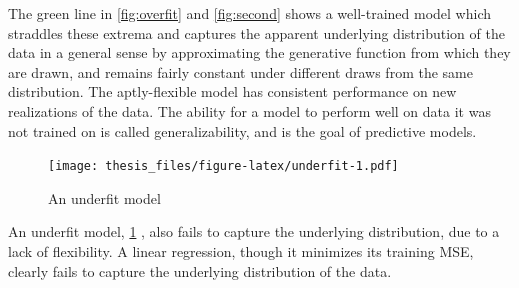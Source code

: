 \documentclass[12pt,twoside]{reedthesis}
\begin{document}
The green line in \ref{fig:overfit} and \ref{fig:second} shows a
well-trained model which straddles these extrema and captures the
apparent underlying distribution of the data in a general sense by
approximating the generative function from which they are drawn, and
remains fairly constant under different draws from the same
distribution. The aptly-flexible model has consistent performance on new
realizations of the data. The ability for a model to perform well on
data it was not trained on is called generalizability, and is the goal
of predictive models.
\begin{figure}
\centering
\texttt{[image: thesis\_files/figure-latex/underfit-1.pdf]}
\caption{\label{fig:underfit}An underfit model}
\end{figure}
An underfit model, \ref{fig:underfit} , also fails to capture the
underlying distribution, due to a lack of flexibility. A linear
regression, though it minimizes its training MSE, clearly fails to
capture the underlying distribution of the data.
\end{document}
